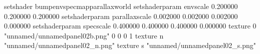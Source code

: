setshader bumpenvspecmapparallaxworld
setshaderparam envscale 0.200000 0.200000 0.200000
setshaderparam parallaxscale 0.002000 0.002000 0.002000 0.000000
setshaderparam specscale 0.400000 0.400000 0.400000 0.000000
texture 0 "unnamed/unnamedpanel02b.png" 0 0 0 1
texture n "unnamed/unnamedpanel02_n.png"
texture s "unnamed/unnamedpanel02_s.png"